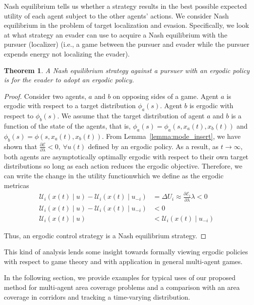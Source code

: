 \documentclass[letterpaper, 10 pt, conference]{ieeeconf}  %
\newtheorem{theorem}{Theorem}
\begin{document}
Nash equilibrium tells us whether a strategy results in the best possible expected utility of each agent subject to the other agents' actions.
We consider Nash equilibrium in the problem of target localization and evasion.
Specifically, we look at what strategy an evader can use to acquire a Nash equilibrium with the pursuer (localizer) (i.e., a game between the pursuer and evader while the pursuer expends energy not localizing the evader).
\begin{theorem}
A Nash equilibrium strategy against a pursuer with an ergodic policy is for the evader to adopt an ergodic policy.
\end{theorem}
\begin{proof}
Consider two agents, $a$ and $b$ on opposing sides of a game.
Agent $a$ is ergodic with respect to a target distribution $\phi_a(s)$. 
Agent $b$ is ergodic with respect to $\phi_b(s)$.
We assume that the target distribution of agent $a$ and $b$ is a function of the state of the agents, that is, $\phi_a(s) = \phi_a(s, x_a(t), x_b(t))$ and  $\phi_b(s) = \phi(s, x_a(t), x_b(t))$.
From Lemma~\ref{lemma:mode_insert}, we have shown that $\frac{\partial \mathcal{E}}{\partial \lambda} < 0 ,\ \forall u(t)$ defined by an ergodic policy.
As a result, as $t \to \infty$, both agents are asymptotically optimally ergodic with respect to their own target distributions so long as each action reduces the ergodic objective.
Therefore, we can write the change in the utility function\textemdash which we define as the ergodic metric\textemdash as
\begin{align*}
\mathcal{U}_i(x(t) \mid u) - \mathcal{U}_i(x(t) \mid u_{-i} ) & = \Delta U_i  \approx \frac{\partial \mathcal{E}_i}{\partial \lambda} \lambda < 0 \\
\mathcal{U}_i(x(t) \mid u) - \mathcal{U}_i(x(t) \mid u_{-i} )  & < 0 \\
\mathcal{U}_i(x(t) \mid u) &< \mathcal{U}_i(x(t) \mid u_{-i} )
\end{align*}

Thus, an ergodic control strategy is a Nash equilibrium strategy.
\end{proof}

This kind of analysis lends some insight towards formally viewing ergodic policies with respect to game theory and with application in general multi-agent games.

In the following section, we provide examples for typical uses of our proposed method for multi-agent area coverage problems and a comparison with an area coverage in corridors and tracking a time-varying distribution.
\end{document}
